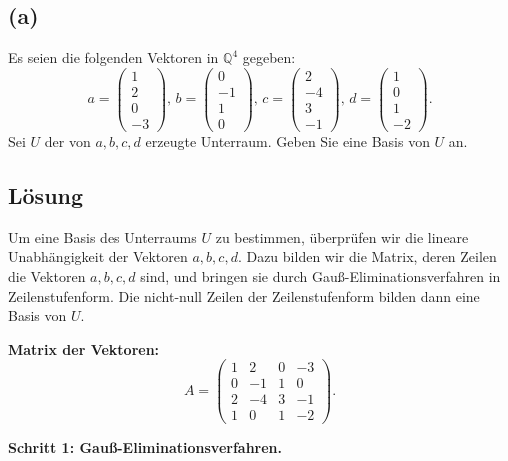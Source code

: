 \documentclass[11pt]{article}
\begin{document}
\subsection*{(a)}

Es seien die folgenden Vektoren in \( \mathbb{Q}^4 \) gegeben:
\[
a = \begin{pmatrix} 1 \\ 2 \\ 0 \\ -3 \end{pmatrix}, \,
b = \begin{pmatrix} 0 \\ -1 \\ 1 \\ 0 \end{pmatrix}, \,
c = \begin{pmatrix} 2 \\ -4 \\ 3 \\ -1 \end{pmatrix}, \,
d = \begin{pmatrix} 1 \\ 0 \\ 1 \\ -2 \end{pmatrix}.
\]
Sei \( U \) der von \( a, b, c, d \) erzeugte Unterraum. Geben Sie eine Basis von \( U \) an.

\subsection*{Lösung}

Um eine Basis des Unterraums \( U \) zu bestimmen, überprüfen wir die lineare Unabhängigkeit der Vektoren \( a, b, c, d \). Dazu bilden wir die Matrix, deren Zeilen die Vektoren \( a, b, c, d \) sind, und bringen sie durch Gauß-Eliminationsverfahren in Zeilenstufenform. Die nicht-null Zeilen der Zeilenstufenform bilden dann eine Basis von \( U \).

\textbf{Matrix der Vektoren:}
\[
A = \begin{pmatrix}
1 & 2 & 0 & -3 \\
0 & -1 & 1 & 0 \\
2 & -4 & 3 & -1 \\
1 & 0 & 1 & -2
\end{pmatrix}.
\]

\textbf{Schritt 1: Gauß-Eliminationsverfahren.}
\end{document}
